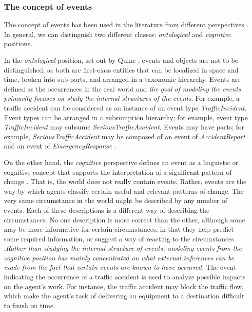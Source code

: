 \subsubsection{The concept of events} %
\label{ssub:the_concept_of_events}
The concept of events has been used in the literature from different perspectives \cite{worboys2005a}. In general, we can distinguish two different classes: \emph{ontological} and \emph{cognitive} positions. 

In the \emph{ontological} position, set out by Quine \cite{quine1985events}, events and objects are not to be distinguished, as both are first-class entities that can be localized in space and time, broken into sub-parts, and arranged in a taxonomic hierarchy. Events are defined as the occurrences in the real world and \emph{the goal of modeling the events primarily focuses on study the internal structures of the events}. For example, a traffic accident can be considered as an instance of an event type \emph{TrafficIncident}. Event types can be arranged in a subsumption hierarchy; for example, event type \emph{TrafficIncident} may subsume \emph{SeriousTrafficAccident}. Events may have parts; for example, \emph{SeriousTrafficAccident} may be composed of an event of \emph{AccidentReport} and an event of \emph{EmergencyResponse} \cite{worboys2005a}.  

On the other hand, the \emph{cognitive} perspective defines an event as a linguistic or cognitive concept that supports the interpretation of a significant pattern of change \cite{allen1994actions}. That is, the world does not really contain events. Rather, events are the way by which agents classify certain useful and relevant patterns of change. The very same circumstance in the world might be described by any number of events. Each of these descriptions is a different way of describing the circumstances. No one description is more correct than the other, although some may be more informative for certain circumstances, in that they help predict some required information, or suggest a way of reacting to the circumstances \cite{allen1994actions}.\emph{Rather than studying the internal structure of events, modeling events from the cognitive position has mainly concentrated on what external inferences can be made from the fact that certain events are known to have occurred.} The event indicating the occurrence of a traffic accident is used to analyze possible impacts on the agent's work. For instance, the traffic accident may block the traffic flow, which make the agent's task of delivering an equipment to a destination difficult to finish on time. 

